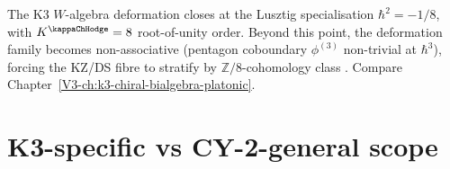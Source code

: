 \begin{remark}
\label{rem:wac-2}
The K3 $W$-algebra deformation closes at the Lusztig specialisation
$\hbar^2 = -1/8$, with $K^{\kappaChHodge} = 8$ root-of-unity
order. Beyond this point, the deformation family becomes non-associative
(pentagon coboundary $\phi^{(3)}$ non-trivial at $\hbar^3$), forcing the
KZ/DS fibre to stratify by $\mathbb Z/8$-cohomology class
\cite{Lusztig1990,EtingofKazhdan2007PartV}. Compare
Chapter~\ref{V3-ch:k3-chiral-bialgebra-platonic}.
\end{remark}

\section{K3-specific vs CY-2-general scope}
\label{sec:wac-supplement-ii}

